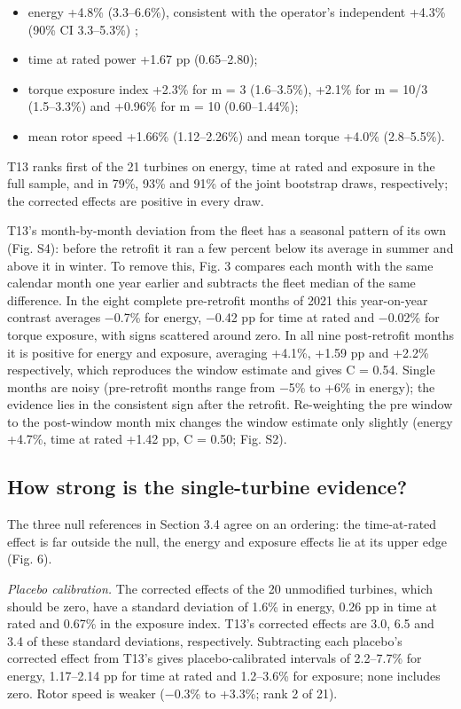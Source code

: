 \documentclass[preprint,12pt]{elsarticle}
\begin{document}
\begin{itemize}
\item
  energy +4.8\% (3.3--6.6\%), consistent with the operator's independent +4.3\% (90\% CI 3.3--5.3\%) \cite{clerc};
\item
  time at rated power +1.67 pp (0.65--2.80);
\item
  torque exposure index +2.3\% for m = 3 (1.6--3.5\%), +2.1\% for m = 10/3 (1.5--3.3\%) and +0.96\% for m = 10 (0.60--1.44\%);
\item
  mean rotor speed +1.66\% (1.12--2.26\%) and mean torque +4.0\% (2.8--5.5\%).
\end{itemize}

T13 ranks first of the 21 turbines on energy, time at rated and exposure in the full sample, and in 79\%, 93\% and 91\% of the joint bootstrap draws, respectively; the corrected effects are positive in every draw.

T13's month-by-month deviation from the fleet has a seasonal pattern of its own (Fig. S4): before the retrofit it ran a few percent below its average in summer and above it in winter. To remove this, Fig. 3 compares each month with the same calendar month one year earlier and subtracts the fleet median of the same difference. In the eight complete pre-retrofit months of 2021 this year-on-year contrast averages −0.7\% for energy, −0.42 pp for time at rated and −0.02\% for torque exposure, with signs scattered around zero. In all nine post-retrofit months it is positive for energy and exposure, averaging +4.1\%, +1.59 pp and +2.2\% respectively, which reproduces the window estimate and gives C = 0.54. Single months are noisy (pre-retrofit months range from −5\% to +6\% in energy); the evidence lies in the consistent sign after the retrofit. Re-weighting the pre window to the post-window month mix changes the window estimate only slightly (energy +4.7\%, time at rated +1.42 pp, C = 0.50; Fig. S2).

\subsection{How strong is the single-turbine evidence?}

The three null references in Section 3.4 agree on an ordering: the time-at-rated effect is far outside the null, the energy and exposure effects lie at its upper edge (Fig. 6).

\emph{Placebo calibration.} The corrected effects of the 20 unmodified turbines, which should be zero, have a standard deviation of 1.6\% in energy, 0.26 pp in time at rated and 0.67\% in the exposure index. T13's corrected effects are 3.0, 6.5 and 3.4 of these standard deviations, respectively. Subtracting each placebo's corrected effect from T13's gives placebo-calibrated intervals of 2.2--7.7\% for energy, 1.17--2.14 pp for time at rated and 1.2--3.6\% for exposure; none includes zero. Rotor speed is weaker (−0.3\% to +3.3\%; rank 2 of 21).
\end{document}
